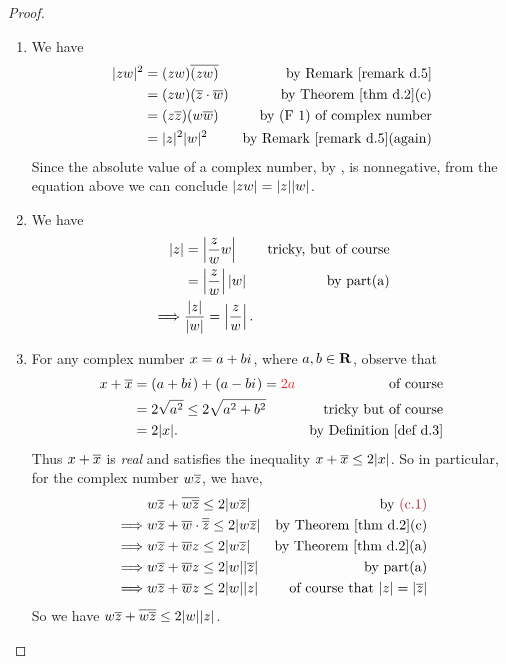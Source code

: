 \begin{proof} \ 

\begin{enumerate}
\item We have
\begin{align*}
    \abs{zw}^2 & = (zw)\conjugatet{(zw)} & \text{by \RMK{d.5}} \\
        & = (zw)(\conjugatet{z} \cdot \conjugatet{w}) & \text{by \THM{d.2}(c)} \\
        & = (z\conjugatet{z})(w\conjugatet{w}) & \text{by (F 1) of complex number} \\
        & = \abs{z}^2 \abs{w}^2 & \text{by \RMK{d.5}(again)}
\end{align*}
Since the absolute value of a complex number, by , is nonnegative, from the equation above we can conclude \(\lvert zw\rvert = \lvert z\rvert\lvert w\rvert\).

\item We have
\begin{align*}
    \lvert z\rvert & = \left| \frac{z}{w} w \right| & \text{tricky, but of course} \\
        & = \left| \frac{z}{w} \right| \lvert w\rvert & \text{by part(a)} \\
    \implies & \frac{\lvert z\rvert}{\lvert w\rvert} = \left| \frac{z}{w} \right|.
\end{align*}

\item For any complex number \(x = a + b{i\mkern1mu}\), where \(a, b \in \mathbf{R}\), observe that
\begin{align*}
    x + \conjugatet{x} & = (a + b\iu) + (a - b\iu) = \RED{2a} & \text{of course} \\
        & = 2 \sqrt{a^2} \le 2 \sqrt{a^2 + b^2} & \text{tricky but of course} \\
        & = 2 \abs{x}. & \text{by \DEF{d.3}}
\end{align*}
Thus \(x + \overline{x}\) is \emph{real} and satisfies the inequality \(x + \overline{x} \le 2\lvert x\rvert\). 
So in particular, for the complex number \(w\overline{z}\), we have,
\begin{align*}
             & w\conjugatet{z} + \conjugatet{w\conjugatet{z}} \le 2\abs{w\conjugatet{z}} & \text{by \MAROON{(c.1)}} \\
    \implies & w\conjugatet{z} + \conjugatet{w} \cdot \conjugatet{\conjugatet{z}} \le 2\abs{w\conjugatet{z}} & \text{by \THM{d.2}(c)} \\
    \implies & w\conjugatet{z} + \conjugatet{w}z \le 2\abs{w\conjugatet{z}} & \text{by \THM{d.2}(a)} \\
    \implies & w\conjugatet{z} + \conjugatet{w}z \le 2\abs{w}\abs{\conjugatet{z}} & \text{by part(a)} \\
    \implies & w\conjugatet{z} + \conjugatet{w}z \le 2\abs{w}\abs{z} & \text{of course that \(\abs{z} = \abs{\conjugatet{z}}\)}
\end{align*}
So we have \(w\overline{z} + \overline{w\overline{z}} \le 2\lvert w\rvert\lvert z\rvert\). 


\end{enumerate}
\end{proof}

